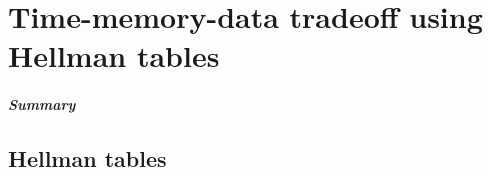 \chapter{Time-memory-data tradeoff using Hellman tables}
\label{chapter:tmdto-hellman}

\paragraph{Summary}


\section{Hellman tables}


